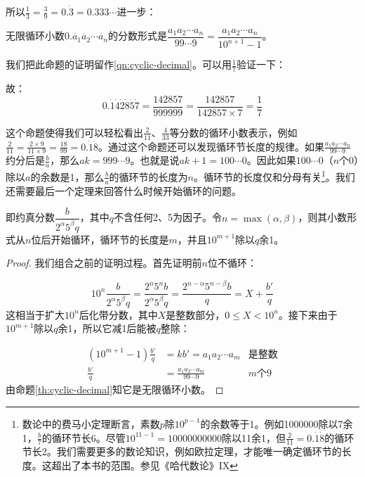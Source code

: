 \documentclass[b5paper]{ctexart}
\begin{document}
所以$\frac{1}{3} = \frac{3}{9} = 0.\dot{3} = 0.333\cdots$进一步：

\begin{proposition} \label{th:cyclic-decimal}
无限循环小数$0.\dot{a_1} \dot{a_2} \cdots \dot{a_n}$的分数形式是$\dfrac{a_1 a_2 \cdots a_n}{99 \cdots 9} = \dfrac{a_1 a_2 \cdots a_n}{10^{n+1} - 1}$。
\end{proposition}

我们把此命题的证明留作\cref{qn:cyclic-decimal}。可以用$\frac{1}{7}$验证一下：

\begin{center}
\end{center}

故：
\[
0.\dot{1}\dot{4}\dot{2}\dot{8}\dot{5}\dot{7} = \frac{142857}{999999} = \frac{142857}{142857 \times 7} = \frac{1}{7}
\]

这个命题使得我们可以轻松看出$\frac{2}{11}$、$\frac{4}{33}$等分数的循环小数表示，例如$\frac{2}{11} = \frac{2 \times 9}{11 \times 9} = \frac{18}{99} = 0.\dot{1}\dot{8}$。通过这个命题还可以发现循环节长度的规律。如果$\frac{a_1 a_2 \cdots a_n}{99 \cdots 9}$约分后是$\frac{b}{a}$，那么$ak = 999 \cdots 9$。也就是说$ak + 1 = 100 \cdots 0$。因此如果$100\cdots 0$（$n$个0）除以$a$的余数是1，那么$\frac{b}{a}$的循环节的长度为$n$。循环节的长度仅和分母有关\footnote{数论中的费马小定理断言，素数$p$除$10^{p-1}$的余数等于1。例如1000000除以7余1，$\frac{b}{7}$的循环节长6。尽管$10^{11-1} = 10000000000$除以11余1，但$\frac{2}{11} = 0.\dot{1}\dot{8}$的循环节长2。我们需要更多的数论知识，例如欧拉定理，才能唯一确定循环节的长度。这超出了本书的范围。参见《哈代数论》IX}。我们还需要最后一个定理来回答什么时候开始循环的问题。

\begin{theorem}\label{thm:cyclic-decimal}
即约真分数$\dfrac{b}{2^{\alpha} 5^{\beta} q}$，其中$q$不含任何2、5为因子。令$n = \max(\alpha, \beta)$，则其小数形式从$n$位后开始循环，循环节的长度是$m$，并且$10^{m+1}$除以$q$余1。
\end{theorem}

\begin{proof}
我们组合之前的证明过程。首先证明前$n$位不循环：

\[
10^n \frac{b}{2^{\alpha} 5^{\beta} q} = \frac{2^n 5^n b}{2^{\alpha} 5^{\beta} q} = \frac{2^{n - \alpha} 5^{n - \beta} b}{q} = X + \frac{b'}{q}
\]
这相当于扩大$10^n$后化带分数，其中$X$是整数部分，$0 \leq X < 10^n$。接下来由于$10^{m+1}$除以$q$余1，所以它减1后能被$q$整除：

\begin{align*}
  (10^{m+1} - 1) \frac{b'}{q} &= k b' = a_1 a_2 \cdots a_m & \text{是整数}\\
                \frac{b'}{q} &= \frac{a_1 a_2 \cdots a_m}{99\cdots9} & m\text{个}9
\end{align*}
由命题\ref{th:cyclic-decimal}知它是无限循环小数。
\end{proof}
\end{document}
